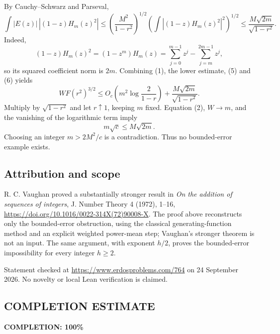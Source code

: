 By Cauchy--Schwarz and Parseval,
\[
\int |E(z)|\,|(1-z)H_m(z)^2|
 \leq\left(\frac{M^2}{1-r^2}\right)^{1/2}
       \left(\int|(1-z)H_m(z)^2|^2\right)^{1/2}
 \leq\frac{M\sqrt{2m}}{\sqrt{1-r^2}}. \tag{6}
\]
Indeed,
\[
(1-z)H_m(z)^2=(1-z^m)H_m(z)
=\sum_{j=0}^{m-1}z^j-\sum_{j=m}^{2m-1}z^j,
\]
so its squared coefficient norm is \(2m\). Combining (1), the lower estimate, (5) and (6) yields
\[
W F(r^2)^{3/2}
\leq O_c\left(m^2\log\frac{2}{1-r}\right)
 +\frac{M\sqrt{2m}}{\sqrt{1-r^2}}.
\]
Multiply by \(\sqrt{1-r^2}\) and let \(r\uparrow1\), keeping \(m\) fixed. Equation (2), \(W\to m\), and the vanishing of the logarithmic term imply
\[
m\sqrt c\leq M\sqrt{2m}.
\]
Choosing an integer \(m>2M^2/c\) is a contradiction. Thus no bounded-error example exists.

\subsection*{Attribution and scope}

R. C. Vaughan proved a substantially stronger result in \emph{On the addition of sequences of integers}, J. Number Theory 4 (1972), 1--16, \url{https://doi.org/10.1016/0022-314X(72)90008-X}. The proof above reconstructs only the bounded-error obstruction, using the classical generating-function method and an explicit weighted power-mean step; Vaughan's stronger theorem is not an input. The same argument, with exponent \(h/2\), proves the bounded-error impossibility for every integer \(h\geq2\).

Statement checked at \url{https://www.erdosproblems.com/764} on 24 September 2026. No novelty or local Lean verification is claimed.
\subsection*{COMPLETION ESTIMATE}
\textbf{COMPLETION: 100\%}
